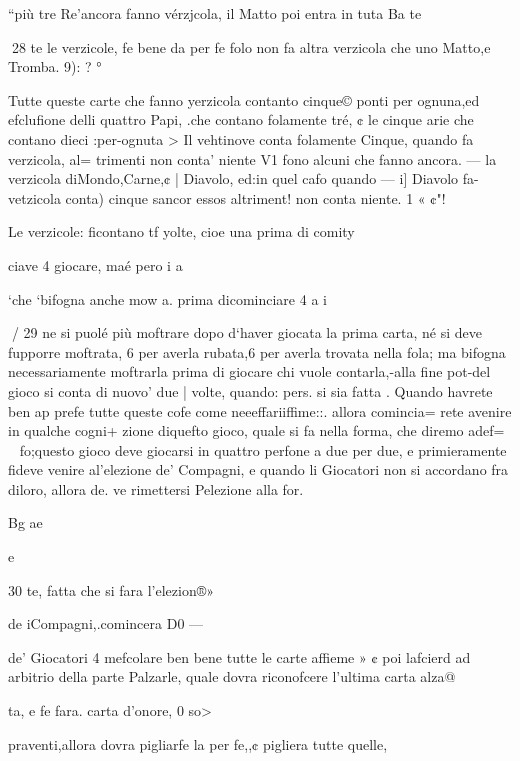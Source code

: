 \documentclass[12pt,a6paper]{article}
\begin{document}
“più tre Re'ancora fanno vérzjcola, il Matto poi entra in tuta
Ba te

 
28
te le verzicole, fe bene da per fe
folo non fa altra verzicola che
uno Matto,e Tromba. 9): ? °

Tutte queste carte che fanno
yerzicola contanto cinque©
ponti per ognuna,ed efclufione
delli quattro Papi, .che contano
folamente tré, ¢ le cinque arie
che contano dieci :per-ognuta >
Il vehtinove conta folamente
Cinque, quando fa verzicola, al=
trimenti non conta’ niente V1
fono alcuni che fanno ancora. —
la verzicola diMondo,Carne,¢ |
Diavolo, ed:in quel cafo quando —
i] Diavolo fa-vetzicola conta)
cinque sancor essos altriment!
non conta niente. 1 « ¢"!

Le verzicole: ficontano tf
yolte, cioe una prima di comity

ciave 4 giocare, maé pero i
a

 

‘che ‘bifogna anche mow a.
prima dicominciare 4 a i

 
/ 29
ne si puolé più moftrare dopo
d‘haver giocata la prima carta,
né si deve fupporre moftrata, 6
per averla rubata,6 per averla
trovata nella fola; ma bifogna
necessariamente moftrarla prima di giocare chi vuole contarla,-alla fine pot-del gioco si
conta di nuovo’ due | volte,
quando: pers. si sia fatta .
Quando havrete ben ap
prefe tutte queste cofe come neeeffariiffime::. allora comincia=
rete avenire in qualche cogni+
zione diquefto gioco, quale si fa
nella forma, che diremo adef=
~ fo;questo gioco deve giocarsi in
quattro perfone a due per due,
e primieramente fideve venire
al’elezione de’ Compagni, e
quando li Giocatori non si accordano fra diloro, allora de.
ve rimettersi Pelezione alla for.

Bg ae

 
 

 

 

 

e

30
te, fatta che si fara l’elezion®»

de iCompagni,.comincera D0 —

de’ Giocatori 4 mefcolare ben
bene tutte le carte affieme » ¢
poi lafcierd ad arbitrio della
parte Palzarle, quale dovra
riconofcere l’ultima carta alza@

ta, e fe fara. carta d’onore, 0 so>

praventi,allora dovra pigliarfe
la per fe,,¢ pigliera tutte quelle,
\end{document}
